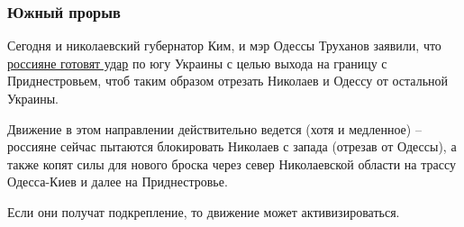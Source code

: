  
 
 
 
 

\subsubsection{Южный прорыв}
\label{sec:11_03_2022.stz.news.ua.strana.1.kiev_v_osade_itogi.3.juzhnyj_proryv}

Сегодня и николаевский губернатор Ким, и мэр Одессы Труханов заявили, что
\href{https://strana.news/news/381290-odessa-trukhanov-i-kim-hovorjat-chto-rossijane-planirujut-nastuplenie-na-odessu.html}{россияне готовят удар} по югу Украины с целью выхода на границу с
Приднестровьем, чтоб таким образом отрезать Николаев и Одессу от остальной
Украины.

Движение в этом направлении действительно ведется (хотя и медленное) – россияне
сейчас пытаются блокировать Николаев с запада (отрезав от Одессы), а также
копят силы для нового броска через север Николаевской области на трассу
Одесса-Киев и далее на Приднестровье.

Если они получат подкрепление, то движение может активизироваться.
